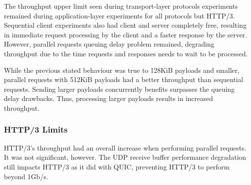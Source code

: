 The throughput upper limit seen during transport-layer protocols experiments remained during application-layer experiments for all protocols but HTTP/3. Sequential client experiments also had client and server completely free, resulting in immediate request processing by the client and a faster response by the server. However, parallel requests queuing delay problem remained, degrading throughput due to the time requests and responses needs to wait to be processed.

While the previous stated behaviour was true to 128KiB payloads and smaller, parallel requests with 512KiB payloads had a better throughput than sequential requests. Sending larger payloads concurrently benefits surpasses the queuing delay drawbacks. Thus, processing larger payloads results in increased throughput.

\subsubsection*{HTTP/3 Limits}

HTTP/3's throughput had an overall increase when performing parallel requests. It was not significant, however. The UDP receive buffer performance degradation still impacts HTTP/3 as it did with QUIC, preventing HTTP/3 to perform beyond 1Gb/s.

\clearpage


